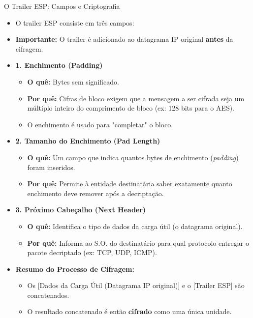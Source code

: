 \begin{frame}{O Trailer ESP: Campos e Criptografia}
    \begin{itemize}
        \item O trailer ESP consiste em três campos:
        \item \textbf{Importante:} O trailer é adicionado ao datagrama IP original \textbf{antes} da cifragem.

        \item \textbf{1. Enchimento (Padding)}
              \begin{itemize}
                  \item \textbf{O quê:} Bytes sem significado.
                  \item \textbf{Por quê:} Cifras de bloco exigem que a mensagem a ser cifrada seja um múltiplo inteiro do comprimento de bloco (ex: 128 bits para o AES).
                  \item O enchimento é usado para "completar" o bloco.
              \end{itemize}

        \item \textbf{2. Tamanho do Enchimento (Pad Length)}
              \begin{itemize}
                  \item \textbf{O quê:} Um campo que indica quantos bytes de enchimento (\textit{padding}) foram inseridos.
                  \item \textbf{Por quê:} Permite à entidade destinatária saber exatamente quanto enchimento deve remover após a decriptação.
              \end{itemize}

        \item \textbf{3. Próximo Cabeçalho (Next Header)}
              \begin{itemize}
                  \item \textbf{O quê:} Identifica o tipo de dados da carga útil (o datagrama original).
                  \item \textbf{Por quê:} Informa ao S.O. do destinatário para qual protocolo entregar o pacote decriptado (ex: TCP, UDP, ICMP).
              \end{itemize}

        \item \textbf{Resumo do Processo de Cifragem:}
              \begin{itemize}
                  \item Os [Dados da Carga Útil (Datagrama IP original)] e o [Trailer ESP] são concatenados.
                  \item O resultado concatenado é então \textbf{cifrado} como uma única unidade.
              \end{itemize}
    \end{itemize}
\end{frame}

